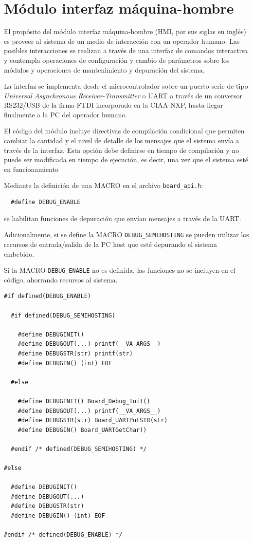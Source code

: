 \section{Módulo interfaz máquina-hombre}
\label{sec:HMI}

El propósito del módulo interfaz máquina-hombre (HMI, por sus siglas en inglés) es proveer al sistema de un medio de interacción con un operador humano. Las posibles interacciones se realizan a través de una interfaz de comandos interactiva y contempla operaciones de configuración y cambio de parámetros sobre los módulos y operaciones de mantenimiento y depuración del sistema.  

La interfaz se implementa desde el microcontrolador sobre un puerto serie de tipo \textit{Universal Asynchronous Receiver-Transmitter} o UART a través de un conversor RS232/USB de la firma FTDI incorporado en la CIAA-NXP, hasta llegar finalmente a la PC del operador humano.

El código del módulo incluye directivas de compilación condicional que permiten cambiar la cantidad y el nivel de detalle de los mensajes que el sistema envía a través de la interfaz.  Esta opción debe definirse en tiempo de compilación y no puede ser modificada en tiempo de ejecución, es decir, una vez que el sistema esté en funcionamiento  

Mediante la definición de una MACRO en el archivo \texttt{board\_api.h}:
\begin{verbatim}
  #define DEBUG_ENABLE
\end{verbatim}

\noindent se habilitan funciones de depuración que envían mensajes a través de la UART.  

Adicionalmente, si se define la MACRO \texttt{DEBUG\_SEMIHOSTING} se pueden utilizar los recursos de entrada/salida de la PC host que esté depurando el sistema embebido. 

Si la MACRO \texttt{DEBUG\_ENABLE} no es definida, las funciones no se incluyen en el código, ahorrando recursos al sistema.

\begin{verbatim}
#if defined(DEBUG_ENABLE)

  #if defined(DEBUG_SEMIHOSTING)
	  
    #define DEBUGINIT()
    #define DEBUGOUT(...) printf(__VA_ARGS__)
    #define DEBUGSTR(str) printf(str)
    #define DEBUGIN() (int) EOF

  #else
  
    #define DEBUGINIT() Board_Debug_Init()
    #define DEBUGOUT(...) printf(__VA_ARGS__)
    #define DEBUGSTR(str) Board_UARTPutSTR(str)
    #define DEBUGIN() Board_UARTGetChar()
  
  #endif /* defined(DEBUG_SEMIHOSTING) */

#else
  
  #define DEBUGINIT()
  #define DEBUGOUT(...)
  #define DEBUGSTR(str)
  #define DEBUGIN() (int) EOF
  
#endif /* defined(DEBUG_ENABLE) */
\end{verbatim}

